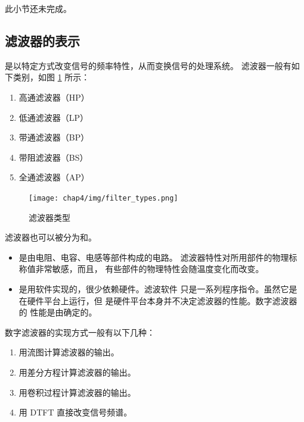 \begin{note}
    此小节还未完成。
\end{note}

\subsection{滤波器的表示}

\begin{definition}
    是以特定方式改变信号的频率特性，从而变换信号的处理系统。
    滤波器一般有如下类别，如图 \ref{fig:filter-types} 所示：
    \begin{enumerate}[label=(\arabic*)]
        \item 高通滤波器（HP）
        \item 低通滤波器（LP）
        \item 带通滤波器（BP）
        \item 带阻滤波器（BS）
        \item 全通滤波器（AP）
    \end{enumerate}
    \begin{figure}[H]
        \centering
        \texttt{[image: chap4/img/filter\_types.png]}
        \caption{滤波器类型}
        \label{fig:filter-types}
    \end{figure}

    滤波器也可以被分为和。
    \begin{itemize}
        \item {}是由电阻、电容、电感等部件构成的电路。
            滤波器特性对所用部件的物理标称值非常敏感，而且，
            有些部件的物理特性会随温度变化而改变。
        \item {}是用软件实现的，很少依赖硬件。滤波软件
            只是一系列程序指令。虽然它是在硬件平台上运行，但
            是硬件平台本身并不决定滤波器的性能。数字滤波器的
            性能是由确定的。
    \end{itemize}
    数字滤波器的实现方式一般有以下几种：
    \begin{enumerate}
        \item 用流图计算滤波器的输出。
        \item 用差分方程计算滤波器的输出。
        \item 用卷积过程计算滤波器的输出。
        \item 用 DTFT 直接改变信号频谱。
    \end{enumerate}
\end{definition}

